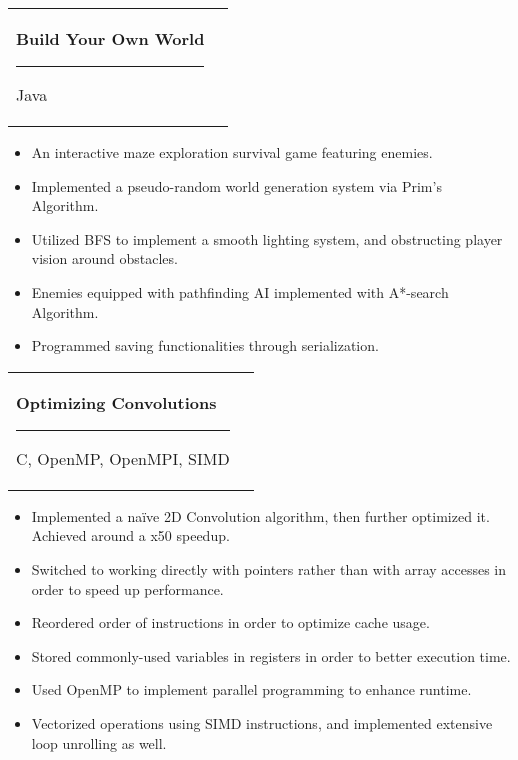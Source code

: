 \documentclass[letterpaper,11pt]{article}
\makeatletter
\newcommand{\resumeItem}[2]{
	\item\small{
		\textbf{#1}{: #2 \vspace{-2pt}}
	}
}
\newcommand{\resumeItemTwo}[1]{
	\item\small{
		#1 \vspace{-2pt}}
}
\newcommand{\resumeSubheadingTwo}[2]{
	\vspace{-1pt}\item
	\begin{tabular*}{0.97\textwidth}[t]{l@{\extracolsep{\fill}}r}
		\textbf{#1} \rule[-0.4ex]{0.1ex}{1.2em} #2 \\
	\end{tabular*}\vspace{-5pt}
}
\newcommand{\resumeSubSubheading}[2]{
	\begin{tabular*}{0.97\textwidth}{l@{\extracolsep{\fill}}r}
		\textit{\small#1} & \textit{\small #2} \\
	\end{tabular*}\vspace{-5pt}
}
\newcommand{\resumeItemListStart}{\begin{itemize}}
\newcommand{\resumeItemListEnd}{\end{itemize}\vspace{-5pt}}
\makeatother
\begin{document}
	\resumeSubheadingTwo
	{Build Your Own World}{Java}
	\resumeItemListStart
	\resumeItemTwo{An interactive maze exploration survival game featuring enemies.}
	\resumeItemTwo{Implemented a pseudo-random world generation system via Prim's Algorithm.}
	\resumeItemTwo{Utilized BFS to implement a smooth lighting system, and obstructing player vision around obstacles.}
	\resumeItemTwo{Enemies equipped with pathfinding AI implemented with A*-search Algorithm.}
	\resumeItemTwo{Programmed saving functionalities through serialization.}
	\resumeItemListEnd
	
	
	
	\resumeSubheadingTwo
	{Optimizing Convolutions}{C, OpenMP, OpenMPI, SIMD}
	\resumeItemListStart
	\resumeItemTwo{Implemented a na\"ive 2D Convolution algorithm, then further optimized it. Achieved around a x50 speedup.}
	\resumeItemTwo{Switched to working directly with pointers rather than with array accesses in order to speed up performance.}
	\resumeItemTwo{Reordered order of instructions in order to optimize cache usage.}
	\resumeItemTwo{Stored commonly-used variables in registers in order to better execution time.}
	\resumeItemTwo{Used OpenMP to implement parallel programming to enhance runtime.}
	\resumeItemTwo{Vectorized operations using SIMD instructions, and implemented extensive loop unrolling as well.}
	\resumeItemListEnd
	
	
\end{document}
